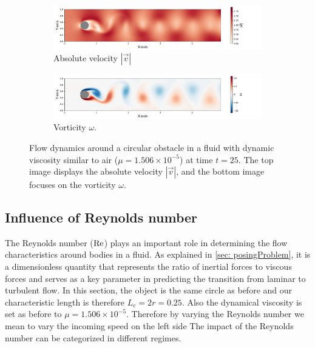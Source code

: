 \begin{figure}[!htb]
    \centering
    \hspace*{0.7cm}
    \begin{subfigure}[b]{\linewidth} %
        \includegraphics[width=\linewidth]{0_graphics/numeric/absV_25_sim.pdf}
        \caption{Absolute velocity $|\vec{v}|$}
        \label{fig:abs_velocity_25}
    \end{subfigure}
    \vspace{1em} %
    \hspace*{0.7cm}
    \begin{subfigure}[b]{\linewidth} %
        \includegraphics[width=\linewidth]{0_graphics/numeric/vor_25_sim.pdf} %
        \caption{Vorticity $\omega$.}
        \label{fig:vorticity_25}
    \end{subfigure}
    \vspace{-15pt}
    \caption{Flow dynamics around a circular obstacle in a fluid with dynamic viscosity similar to air ($\mu = 1.506 \times 10^{-5}$) at time $t=25$. The top image displays the absolute velocity $|\vec{v}|$, and the bottom image focuses on the vorticity $\omega$.}
    \label{fig:first_karman}
\end{figure}


\subsection{Influence of Reynolds number}
The Reynolds number ($\mathrm{Re}$) plays an important role in determining the flow characteristics around bodies in a fluid. As explained in \cref{sec: posingProblem}, it is a dimensionless quantity that represents the ratio of inertial forces to viscous forces and serves as a key parameter in predicting the transition from laminar to turbulent flow. In this section, the object is the same circle as before and our characteristic length is therefore $L_c = 2  r = 0.25$. Also the dynamical viscosity is set as before to $\mu = 1.506 \times 10^{-5}$. Therefore by varying the Reynolds number we mean to vary the incoming speed on the left side
The impact of the Reynolds number can be categorized in different regimes. 




